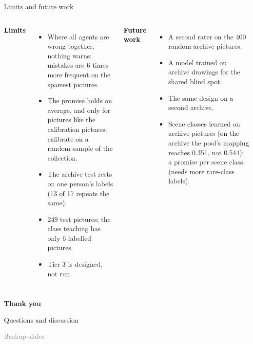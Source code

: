 \documentclass[aspectratio=169,11pt]{beamer}
\begin{document}
\begin{frame}{Limits and future work}
\begin{columns}[T]
\textbf{Limits}
\begin{itemize}\setlength\itemsep{2pt}
  \item Where all agents are wrong together, nothing warns: mistakes are 6 times more frequent on the sparsest pictures.
  \item The promise holds on average, and only for pictures like the calibration pictures: calibrate on a random sample of the collection.
  \item The archive test rests on one person's labels (13 of 17 repeats the same).
  \item 249 test pictures; the class teaching has only 6 labelled pictures.
  \item Tier 3 is designed, not run.
\end{itemize}
\textbf{Future work}
\begin{itemize}\setlength\itemsep{2pt}
  \item A second rater on the 400 random archive pictures.
  \item A model trained on archive drawings for the shared blind spot.
  \item The same design on a second archive.
  \item Scene classes learned on archive pictures (on the archive the pool's mapping reaches 0.351, not 0.544); a promise per scene class (needs more rare-class labels).
\end{itemize}
\end{columns}
\end{frame}

\begin{frame}
\centering
\vspace{1.2cm}
{\Large\textbf{\textcolor{accent}{Thank you}}}

\vspace{0.6cm}
Questions and discussion
\end{frame}

\begin{frame}
\centering
\vspace{1.4cm}
{\large\textcolor{grey}{Backup slides}}
\end{frame}
\end{document}
